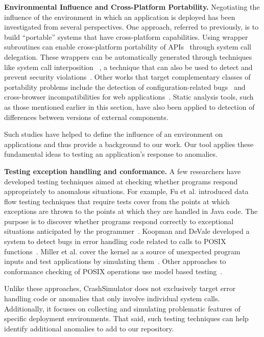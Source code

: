 \noindent
{\bf Environmental Influence and Cross-Platform Portability.}
Negotiating the influence of the environment in which an
application is deployed has been investigated from several
perspectives. One approach, referred to previously,
is to build ``portable'' systems
that have cross-platform capabilities.
Using wrapper subroutines
can enable cross-platform portability
of APIs~\cite{bartolomeicompliance} through system call delegation.
These wrappers can be automatically generated through techniques like
system call interposition ~\cite{Guo:2011:CUS:2002181.2002202}, a
technique that can also be used to detect and prevent security
violations~\cite{Hofmeyr:1998:IDU:1298081.1298084,
Acharya:2000:MUP:1251306.1251307}.
Other works that target complementary classes of portability problems
include the detection of configuration-related bugs~\cite{skoll:icse:2004,
Yilmaz:issta:2004, Fouche:issta:2009, Kastner12, Nguyen14} and
cross-browser incompatibilities for web
applications~\cite{DBLP:conf/icsm/ChoudharyVO10, silakov2010improving,
DBLP:conf/icse/Choudhary11, Mesbah:2011:ACC:1985793.1985870,
DBLP:conf/icst/DallmeierP0MZ14}.  Static analysis tools, such as those
mentioned earlier in this section, have also been applied to
detection of differences between versions of external components.

Such studies have helped to define the influence of an environment on
applications and thus provide a background to our work.  Our tool applies
these fundamental ideas to testing an application's response to anomalies.

\noindent
{\bf Testing exception handling and conformance.}
A few researchers have developed testing techniques aimed at checking
whether programs respond appropriately to anomalous situations.  For
example, Fu et al. introduced data flow testing techniques that require
tests cover from the points at which exceptions are thrown to the points
at which they are handled in Java code. The purpose is to discover whether
programs respond correctly to exceptional situations anticipated by the
programmer~\cite{DBLP:journals/tse/FuMRW05}.  Koopman and DeVale developed
a system to detect bugs in error handling code related to calls to POSIX
functions~\cite{Koopman00theexception}.  Miller et al. cover the kernel as
a source of unexpected program inputs and test applications by simulating
them~\cite{murphyslaw}.
Other approaches to conformance checking of POSIX operations use model
based testing~\cite{Dadeau:2008:CSM:1433121.1433137,Farchi02}.

Unlike these approaches, CrashSimulator does not exclusively target error
handling code or anomalies that only involve individual system calls.
Additionally, it focuses on collecting and simulating
problematic features of specific
deployment environments.
That said, such testing techniques
can help identify additional anomalies  to add to our repository.

